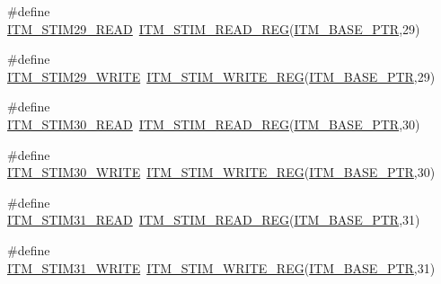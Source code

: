 \begin{DoxyCompactItemize}
\item 
\#define \hyperlink{group___i_t_m___register___accessor___macros_ga91514a35de0d63d08518557abf3a4092}{I\+T\+M\+\_\+\+S\+T\+I\+M29\+\_\+\+R\+E\+AD}~\hyperlink{group___i_t_m___register___accessor___macros_ga5009882336aadcd4f37b45cf3395c450}{I\+T\+M\+\_\+\+S\+T\+I\+M\+\_\+\+R\+E\+A\+D\+\_\+\+R\+EG}(\hyperlink{group___i_t_m___peripheral_gafaddee8fe8b6a898d4e5edc43ee0d703}{I\+T\+M\+\_\+\+B\+A\+S\+E\+\_\+\+P\+TR},29)
\item 
\#define \hyperlink{group___i_t_m___register___accessor___macros_gaf42116fa71e252ae421c078e1de7058b}{I\+T\+M\+\_\+\+S\+T\+I\+M29\+\_\+\+W\+R\+I\+TE}~\hyperlink{group___i_t_m___register___accessor___macros_ga049ca92a4e78e77c19af81e51aa73f1c}{I\+T\+M\+\_\+\+S\+T\+I\+M\+\_\+\+W\+R\+I\+T\+E\+\_\+\+R\+EG}(\hyperlink{group___i_t_m___peripheral_gafaddee8fe8b6a898d4e5edc43ee0d703}{I\+T\+M\+\_\+\+B\+A\+S\+E\+\_\+\+P\+TR},29)
\item 
\#define \hyperlink{group___i_t_m___register___accessor___macros_ga24e46238f0f743da6b080a2cbb500ff5}{I\+T\+M\+\_\+\+S\+T\+I\+M30\+\_\+\+R\+E\+AD}~\hyperlink{group___i_t_m___register___accessor___macros_ga5009882336aadcd4f37b45cf3395c450}{I\+T\+M\+\_\+\+S\+T\+I\+M\+\_\+\+R\+E\+A\+D\+\_\+\+R\+EG}(\hyperlink{group___i_t_m___peripheral_gafaddee8fe8b6a898d4e5edc43ee0d703}{I\+T\+M\+\_\+\+B\+A\+S\+E\+\_\+\+P\+TR},30)
\item 
\#define \hyperlink{group___i_t_m___register___accessor___macros_ga04082ae600d9a3012f4c9861fe7d0ea3}{I\+T\+M\+\_\+\+S\+T\+I\+M30\+\_\+\+W\+R\+I\+TE}~\hyperlink{group___i_t_m___register___accessor___macros_ga049ca92a4e78e77c19af81e51aa73f1c}{I\+T\+M\+\_\+\+S\+T\+I\+M\+\_\+\+W\+R\+I\+T\+E\+\_\+\+R\+EG}(\hyperlink{group___i_t_m___peripheral_gafaddee8fe8b6a898d4e5edc43ee0d703}{I\+T\+M\+\_\+\+B\+A\+S\+E\+\_\+\+P\+TR},30)
\item 
\#define \hyperlink{group___i_t_m___register___accessor___macros_ga6643b5b69131aa2163f02c7d27c2305c}{I\+T\+M\+\_\+\+S\+T\+I\+M31\+\_\+\+R\+E\+AD}~\hyperlink{group___i_t_m___register___accessor___macros_ga5009882336aadcd4f37b45cf3395c450}{I\+T\+M\+\_\+\+S\+T\+I\+M\+\_\+\+R\+E\+A\+D\+\_\+\+R\+EG}(\hyperlink{group___i_t_m___peripheral_gafaddee8fe8b6a898d4e5edc43ee0d703}{I\+T\+M\+\_\+\+B\+A\+S\+E\+\_\+\+P\+TR},31)
\item 
\#define \hyperlink{group___i_t_m___register___accessor___macros_gab792df922db5e627bc1d9917ff6b4ac2}{I\+T\+M\+\_\+\+S\+T\+I\+M31\+\_\+\+W\+R\+I\+TE}~\hyperlink{group___i_t_m___register___accessor___macros_ga049ca92a4e78e77c19af81e51aa73f1c}{I\+T\+M\+\_\+\+S\+T\+I\+M\+\_\+\+W\+R\+I\+T\+E\+\_\+\+R\+EG}(\hyperlink{group___i_t_m___peripheral_gafaddee8fe8b6a898d4e5edc43ee0d703}{I\+T\+M\+\_\+\+B\+A\+S\+E\+\_\+\+P\+TR},31)

\end{DoxyCompactItemize}
